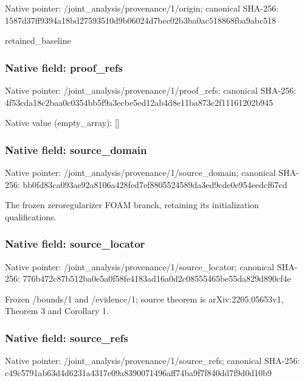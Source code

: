 \documentclass[10pt,a4paper]{article}
\begin{document}
Native pointer: /joint\_analysis/provenance/1/origin; canonical SHA-256: 1587d37ff9394a18bd275935\allowbreak{}10d9b06024d7bec02b3ba0ac\allowbreak{}518868fba9abc518


retained\_baseline


\subsubsection{Native field: proof\_refs}


Native pointer: /joint\_analysis/provenance/1/proof\_refs; canonical SHA-256: 4f53cda18c2baa0c0354bb5f\allowbreak{}9a3ecbe5ed12ab4d8e11ba87\allowbreak{}3c2f11161202b945



Native value (empty\_array): []



\subsubsection{Native field: source\_domain}


Native pointer: /joint\_analysis/provenan\allowbreak{}ce/1/source\_domain; canonical SHA-256: bb0fd83ca093ae92a8106a42\allowbreak{}8fed7ef8805524589da3ed9c\allowbreak{}de0e954eedcf67cd


The frozen zeroregularizer FOAM branch, retaining its initialization qualifications.


\subsubsection{Native field: source\_locator}


Native pointer: /joint\_analysis/provenan\allowbreak{}ce/1/source\_locator; canonical SHA-256: 776b472c87b512ba0e5a0f58\allowbreak{}fe4183ad16a0d2c08555465b\allowbreak{}e55da829d890cf4e


Frozen /bounds/1 and /evidence/1; source theorem is arXiv:2205.05653v1, Theorem 3 and Corollary 1.


\subsubsection{Native field: source\_refs}


Native pointer: /joint\_analysis/provenan\allowbreak{}ce/1/source\_refs; canonical SHA-256: c49c5791ab63d4d6231a4317\allowbreak{}e09a8390071496aff74ba9f7\allowbreak{}f840dd7f9d0d10b9
\end{document}
